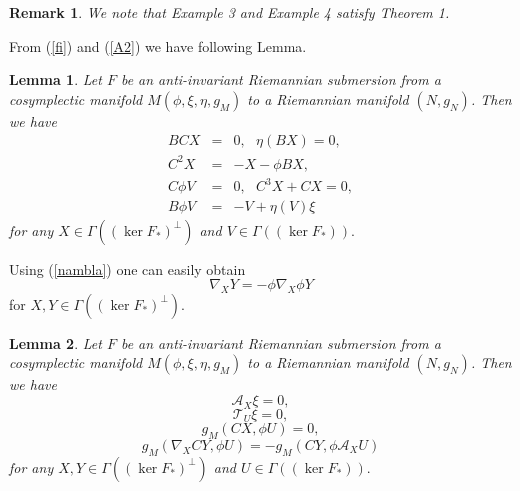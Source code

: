 \documentclass{amsart}
\theoremstyle{plain}
\newtheorem{lemma}{Lemma}
\newtheorem{remark}{Remark}
\numberwithin{equation}{section}
\begin{document}
\begin{remark}
We note that Example 3 and Example 4 satisfy Theorem 1.
\end{remark}

From (\ref{fi}) and (\ref{A2}) we have following Lemma.

\begin{lemma}
Let $F$ be an anti-invariant Riemannian submersion from a cosymplectic
manifold $M(\phi ,\xi ,\eta ,g_{M})$ to a Riemannian manifold $(N,g_{N})$.
Then we have\begin{eqnarray*}
BCX &=&0,\text{ }\eta (BX)=0, \\
C^{2}X &=&-X-\phi BX, \\
C\phi V &=&0,\text{ }C^{3}X+CX=0, \\
B\phi V &=&-V+\eta (V)\xi
\end{eqnarray*}for any $X\in \Gamma ((\ker F_{\ast })^{\bot })$ and $V\in \Gamma ((\ker
F_{\ast })).$
\end{lemma}

Using (\ref{nambla}) one can easily obtain 
\begin{equation}
\nabla _{X}Y=-\phi \nabla _{X}\phi Y  \label{Namblafi2}
\end{equation}for $X,Y\in \Gamma ((\ker F_{\ast })^{\bot }).$

\begin{lemma}
Let $F$ be an anti-invariant Riemannian submersion from a cosymplectic
manifold $M(\phi ,\xi ,\eta ,g_{M})$ to a Riemannian manifold $(N,g_{N})$.
Then we have\begin{equation}
\mathcal{A}_{X}\xi =0,  \label{C11}
\end{equation}\begin{equation}
\mathcal{T}_{U}\xi =0,  \label{C1,5}
\end{equation}\begin{equation}
g_{M}(CX,\phi U)=0,  \label{C2}
\end{equation}\begin{equation}
g_{M}(\nabla _{X}CY,\phi U)=-g_{M}(CY,\phi \mathcal{A}_{X}U)  \label{C3}
\end{equation}for any $X,Y\in \Gamma ((\ker F_{\ast })^{\bot })$ and $U\in \Gamma ((\ker
F_{\ast })).$
\end{lemma}
\end{document}
